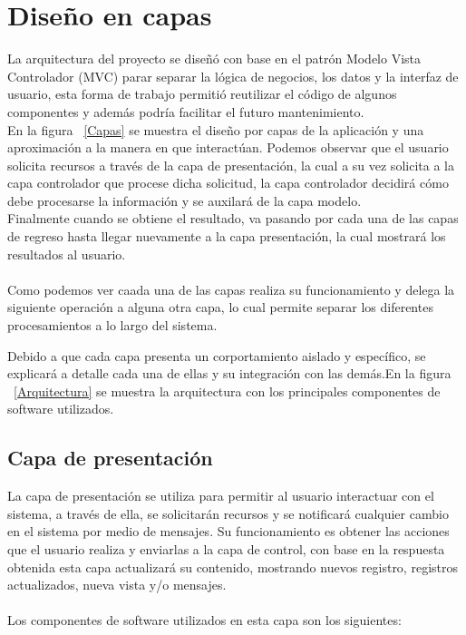 \section{Diseño en capas}


La arquitectura del proyecto se diseñó con base en el patrón Modelo Vista Controlador (MVC) parar separar la lógica de negocios, los datos y la interfaz de usuario, esta forma de trabajo permitió reutilizar el código de algunos componentes y además podría facilitar el futuro mantenimiento.\\ 

En la figura ~\ref{Capas} se muestra el diseño por capas de la aplicación y una aproximación a la manera en que interactúan. Podemos observar que el usuario solicita recursos a través de la capa de presentación, la cual a su vez solicita a la capa controlador que procese dicha solicitud, la capa controlador decidirá cómo
debe procesarse la información y se auxilará de la capa modelo. \\Finalmente cuando se obtiene el resultado, va pasando por cada una de las capas de regreso hasta llegar nuevamente a la capa presentación, la cual mostrará los resultados al usuario. \\\\ 
Como podemos ver caada una de las capas realiza su funcionamiento y delega la siguiente operación a alguna otra capa, lo cual permite separar los diferentes procesamientos a lo largo del sistema.\\

\newpage

Debido a que cada capa presenta un corportamiento aislado y específico, se explicará a detalle cada una de ellas y su integración con las demás.En la figura ~\ref{Arquitectura} se muestra la arquitectura con los principales componentes de software utilizados.

\subsection{Capa de presentación}
La capa de presentación se utiliza para permitir al usuario interactuar con el sistema, a través de ella, se solicitarán recursos y se notificará cualquier cambio en el sistema por medio de mensajes. Su funcionamiento es obtener las acciones que el usuario realiza y enviarlas a la capa de control, con base en la respuesta obtenida esta capa actualizará su contenido, mostrando nuevos registro, registros actualizados, nueva vista y/o mensajes. \\\\
Los componentes de software utilizados en esta capa son los siguientes: \\

